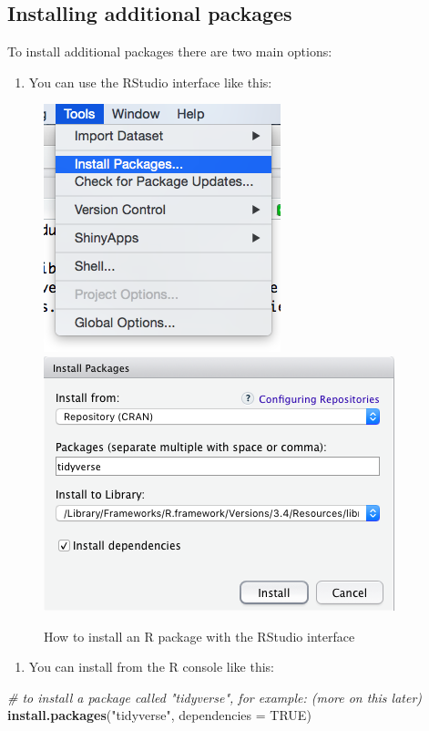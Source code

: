 \documentclass[
]{book}
\newenvironment{Shaded}{\begin{snugshade}}{\end{snugshade}}
\newcommand{\AttributeTok}[1]{\textcolor[rgb]{0.13,0.29,0.53}{#1}}
\newcommand{\CommentTok}[1]{\textcolor[rgb]{0.56,0.35,0.01}{\textit{#1}}}
\newcommand{\ConstantTok}[1]{\textcolor[rgb]{0.56,0.35,0.01}{#1}}
\newcommand{\FunctionTok}[1]{\textcolor[rgb]{0.13,0.29,0.53}{\textbf{#1}}}
\newcommand{\NormalTok}[1]{#1}
\newcommand{\StringTok}[1]{\textcolor[rgb]{0.31,0.60,0.02}{#1}}
\providecommand{\tightlist}{%
  \setlength{\itemsep}{0pt}\setlength{\parskip}{0pt}}
\begin{document}
\hypertarget{installing-additional-packages}{%
\subsection{Installing additional packages}\label{installing-additional-packages}}

To install additional packages there are two main options:

\begin{enumerate}
\def\labelenumi{\arabic{enumi}.}
\tightlist
\item
  You can use the RStudio interface like this:
\end{enumerate}

\begin{figure}
\includegraphics[width=0.4\linewidth]{img/installpckg1} \includegraphics[width=0.4\linewidth]{img/installpckg2} \caption{How to install an R package with the RStudio interface}\label{fig:install-packages}
\end{figure}

\begin{enumerate}
\def\labelenumi{\arabic{enumi}.}
\setcounter{enumi}{1}
\tightlist
\item
  You can install from the R console like this:
\end{enumerate}

\begin{Shaded}
\begin{Highlighting}[]
\CommentTok{\# to install a package called "tidyverse", for example: (more on this later)}
\FunctionTok{install.packages}\NormalTok{(}\StringTok{"tidyverse"}\NormalTok{, }\AttributeTok{dependencies =} \ConstantTok{TRUE}\NormalTok{)}
\end{Highlighting}
\end{Shaded}
\end{document}
